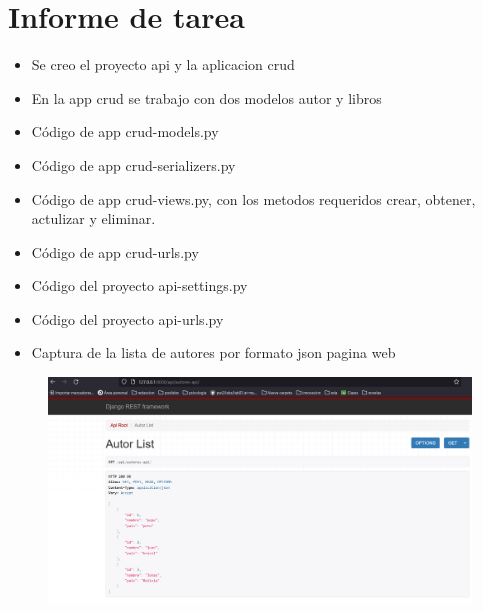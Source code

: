 \documentclass{article}
\begin{document}
	\section{Informe de tarea}
	\begin{itemize}
		\item Se creo el proyecto api y la aplicacion crud
		\item En la app crud se trabajo con dos modelos autor y libros
		\item Código de app crud-models.py
	\end{itemize}
	
	\begin{itemize}
		\item Código de app crud-serializers.py
	\end{itemize}
	
	\begin{itemize}
		\item Código de app crud-views.py, con los metodos requeridos crear, obtener, actulizar y eliminar.
	\end{itemize}
	
	\begin{itemize}
		\item Código de app crud-urls.py
	\end{itemize}
	
	\begin{itemize}
		\item Código del proyecto api-settings.py
	\end{itemize}
	
	\begin{itemize}
		\item Código del proyecto api-urls.py
	\end{itemize}
	
	\begin{itemize}
		\item Captura de la lista de autores por formato json pagina web
	\end{itemize}
	\begin{figure}[H]
		\centering
		\includegraphics[width=1\textwidth,keepaspectratio]{pruebas/tarea-autores.png}
	\end{figure}
\end{document}
